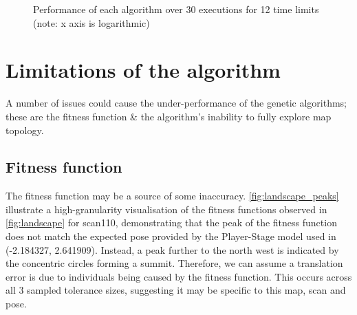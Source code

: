 \documentclass[authoryearcitations]{UoYCSproject}
\begin{document}
\begin{figure}
	\caption[Global-ICP performance against Grid Initialisation] {Performance of each algorithm over 30 executions for 12 time limits (note: x axis is logarithmic)}
	\label{fig:icp_vs_elite_vs_grid_box_whiskers}
\end{figure}






\section{Limitations of the algorithm}
\label{sec:algorithm_limitations}
A number of issues could cause the under-performance of the genetic algorithms; these are the fitness function \& the algorithm's inability to fully explore map topology.

\subsection{Fitness function}
The fitness function may be a source of some inaccuracy. \autoref{fig:landscape_peaks} illustrate a high-granularity visualisation of the fitness functions observed in \autoref{fig:landscape} for scan110, demonstrating that the peak of the fitness function does not match the expected pose provided by the Player-Stage model used in \citet{Lenac2011-co}(-2.184327, 2.641909). Instead, a peak further to the north west is indicated by the concentric circles forming a summit. Therefore, we can assume a translation error is due to individuals being caused by the fitness function. This occurs across all 3 sampled tolerance sizes, suggesting it may be specific to this map, scan and pose.
\end{document}
